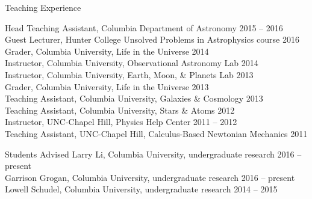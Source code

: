 \documentclass{resume_clark} %
\begin{document}




\begin{rSection}{Teaching Experience}

Head Teaching Assistant, Columbia Department of Astronomy \hfill {2015 -- 2016}\\
Guest Lecturer, Hunter College Unsolved Problems in Astrophysics course \hfill {2016} \\
Grader, Columbia University, Life in the Universe \hfill {2014}\\
Instructor, Columbia University, Observational Astronomy Lab \hfill {2014}\\
Instructor, Columbia University, Earth, Moon, \& Planets Lab \hfill {2013}\\
Grader, Columbia University, Life in the Universe \hfill {2013}\\
Teaching Assistant, Columbia University, Galaxies \& Cosmology \hfill {2013}\\
Teaching Assistant, Columbia University, Stars \& Atoms \hfill {2012}\\
Instructor, UNC-Chapel Hill, Physics Help Center \hfill {2011 -- 2012}\\
Teaching Assistant, UNC-Chapel Hill, Calculus-Based Newtonian Mechanics \hfill {2011}\\

\end{rSection}


\begin{rSection}{Students Advised}
Larry Li, Columbia University, undergraduate research \hfill{2016 -- present}\\
Garrison Grogan, Columbia University, undergraduate research \hfill{2016 -- present}\\
Lowell Schudel, Columbia University, undergraduate research \hfill{2014 -- 2015}\\
\end{rSection}
\end{document}
